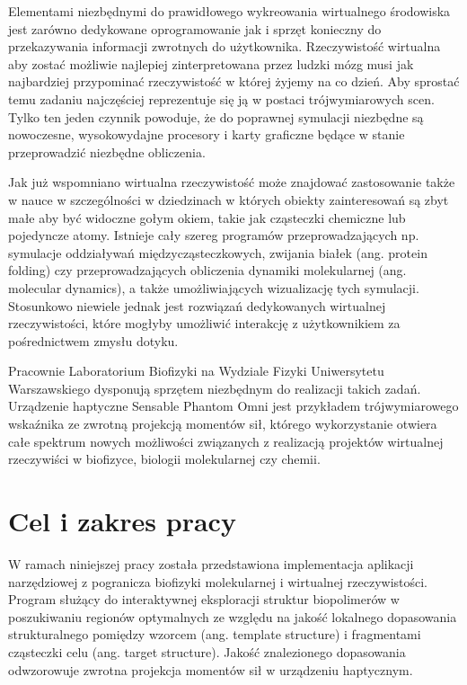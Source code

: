 \documentclass[licencjacka]{pracamgr}
\begin{document}
Elementami niezbędnymi do prawidłowego wykreowania wirtualnego środowiska jest zarówno dedykowane oprogramowanie jak i sprzęt konieczny do przekazywania informacji zwrotnych do użytkownika. Rzeczywistość wirtualna aby zostać możliwie najlepiej zinterpretowana przez ludzki mózg musi jak najbardziej przypominać rzeczywistość w której żyjemy na co dzień. Aby sprostać temu zadaniu najczęściej reprezentuje się ją w postaci trójwymiarowych scen. Tylko ten jeden czynnik powoduje, że do poprawnej symulacji niezbędne są nowoczesne, wysokowydajne procesory i karty graficzne będące w stanie przeprowadzić niezbędne obliczenia.

Jak już wspomniano wirtualna rzeczywistość może znajdować zastosowanie także w nauce w szczególności w dziedzinach w których obiekty zainteresowań są zbyt małe aby być widoczne gołym okiem, takie jak cząsteczki chemiczne lub pojedyncze atomy. Istnieje cały szereg programów przeprowadzających np. symulacje oddziaływań międzycząsteczkowych, zwijania białek (ang. protein folding) czy przeprowadzających obliczenia dynamiki molekularnej (ang. molecular dynamics), a także umożliwiających wizualizację tych symulacji. Stosunkowo niewiele jednak jest rozwiązań dedykowanych wirtualnej rzeczywistości, które mogłyby umożliwić interakcję z użytkownikiem za pośrednictwem zmysłu dotyku. 
	
Pracownie Laboratorium Biofizyki na Wydziale Fizyki Uniwersytetu Warszawskiego dysponują sprzętem niezbędnym do realizacji takich zadań. Urządzenie haptyczne Sensable Phantom Omni jest przykładem trójwymiarowego wskaźnika ze zwrotną projekcją momentów sił, którego wykorzystanie otwiera całe spektrum nowych możliwości związanych z realizacją projektów wirtualnej rzeczywiści w biofizyce, biologii molekularnej czy chemii. 

\chapter*{Cel i zakres pracy}

W ramach niniejszej pracy została przedstawiona implementacja aplikacji narzędziowej z pogranicza biofizyki molekularnej i wirtualnej rzeczywistości. Program służący do interaktywnej eksploracji struktur biopolimerów w poszukiwaniu regionów optymalnych ze względu na jakość lokalnego dopasowania strukturalnego pomiędzy wzorcem (ang. template structure) i fragmentami cząsteczki celu (ang. target structure). Jakość znalezionego dopasowania odwzorowuje zwrotna projekcja momentów sił w urządzeniu haptycznym. 
	
\end{document}
